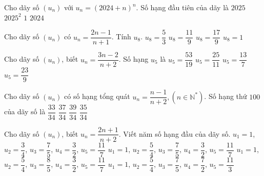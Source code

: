 \begin{ex}%
	Cho dãy số $(u_n)$ với $u_n=(2024+n)^n$. Số hạng đầu tiên của  dãy là
	\choice 
		{\True $2025$} 
		{$2025^2$} 
		 {$1$}
		{$2024$} 
\end{ex}

\begin{ex}%
	Cho dãy số $(u_n)$  có $u_n=\dfrac{2n-1}{n+1}$. Tính $u_8$.
	\choice 
		{\True $u_8=\dfrac{5}{3}$} 
		 {$u_8=\dfrac{11}{9}$}
		{$u_8=\dfrac{17}{9}$} 
		 {$u_8=1$}
\end{ex}

\begin{ex}%
	Cho dãy số $(u_n)$, biết $u_n=\dfrac{3n-2}{n+2}$. Số hạng $u_5$  là
	 \choice
		{$u_5=\dfrac{53}{19}$} 
		 {$u_5=\dfrac{25}{11}$}
		{\True  $u_5=\dfrac{13}{7}$}
		 {$u_5=\dfrac{23}{9}$}
\end{ex}

\begin{ex}%
	Cho dãy số $(u_{n})$ có số hạng tổng quát $u_{n} =\dfrac{n-1}{n+2},\left(n\in \mathbb{N}^{*} \right)$. Số hạng thứ $100$ của dãy số là 
	 \choice
		{\True  $\dfrac{33}{34}$}
		 {$\dfrac{37}{34}$}
		{$\dfrac{39}{34}$} 
		 {$\dfrac{35}{34}$}
\end{ex}

\begin{ex}%
	Cho dãy số $(u_n)$, biết  $u_n=\dfrac{2n+1}{n+2}$. Viết năm số hạng đầu của dãy số.
	\choice 
		{$u_1=1$, $ u_2=\dfrac{3}{4}$, $  u_3=\dfrac{7}{5}$, $u_4=\dfrac{3}{2}$, $ u_5=\dfrac{11}{7}$}
		{\True $u_1=1$, $ u_2=\dfrac{5}{4}$, $ u_3=\dfrac{7}{5}$,  $ u_4=\dfrac{3}{2}$, $ u_5=\dfrac{11}{7}$}
		{$u_1=1$, $u_2=\dfrac{5}{4}$,  $u_3=\dfrac{8}{5}$, $ u_4=\dfrac{3}{2}$, $ u_5=\dfrac{11}{7}$}
		 {$u_1=1$, $u_2=\dfrac{5}{4}$, $u_3=\dfrac{7}{5}$, $ u_4=\dfrac{7}{2}$, $ u_5=\dfrac{11}{3}$}
\end{ex}

